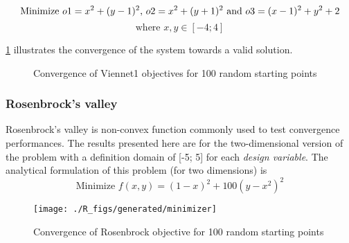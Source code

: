 $$\text{Minimize } o1 = x^2 + (y-1)^2 \text{, } o2 = x^2 + (y+1)^2 \text{ and } o3 = (x-1)^2 + y^2 +2\\$$
$$\text{where } x, y \in  [-4;4]
$$

\figurename \ref{viennet_res} illustrates the convergence of the system towards a valid solution.


\begin{figure}[h]

	\hfill%
	\hfill%
	\caption{Convergence of Viennet1 objectives for 100 random starting points}
	\label{viennet_res}
\end{figure}

\subsubsection{Rosenbrock's valley}

Rosenbrock's valley is non-convex function commonly used to test convergence performances. The results presented here are for the two-dimensional version of the problem with a definition domain of [-5; 5] for each \emph{design variable}.
The analytical formulation of this problem (for two dimensions) is 
$$\text{Minimize } f(x,y) = (1-x)^2 + 100(y - x^2)^2$$

\begin{wrapfigure}{R}{0.5\textwidth}
    \vspace{-50pt}
    \texttt{[image: ./R\_figs/generated/minimizer]}	
    	\vspace{-30pt}
	\caption{Convergence of Rosenbrock objective for 100 random starting points}
	\vspace{-20pt}
\end{wrapfigure}